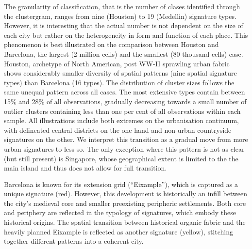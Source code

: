 The granularity of classification, that is the number of clases identified
through the clustergram, ranges from nine (Houston) to 19 (Medellin) signature
types. However, it is interesting that the actual number is not dependent on the size of each
city but rather on the heterogeneity in form and function of each place. This
phenomenon is best illustrated on the comparison
between Houston and Barcelona, the largest (2 million cells) and the smallest (80 thousand
cells) case. Houston, archetype of North American, post WW-II sprawling urban fabric shows
considerably smaller diversity of spatial patterns (nine spatial signature
types) than
Barcelona (16 types).
The distribution of cluster sizes follows the same unequal pattern across
all cases. The most extensive types contain between 15\% and 28\% of all
observations, gradually decreasing towards a small number of
outlier clusters containing less than one per cent of all observations within each sample.
All illustrations include both extremes on the urbanisation continuum, with delineated
central districts on the one hand and non-urban countryside signatures on the
other. We interpret this
transition as a gradual move from more urban signatures to less so. The only
exception where this pattern is not as clear (but
still present) is Singapore, whose geographical extent is limited to the
the main island and thus does not allow for full transition.

Barcelona is known for its extension grid (``Eixample''), which is captured as
a unique signature (red).
However, this development is historically an infill between the city's medieval core and
smaller preexisting peripheric settlements. Both core and periphery are
reflected in the typology of signatures, which embody these historical
origins. The spatial transition between historical organic fabric and the
heavily planned
Eixample is reflected as another signature (yellow), stitching together different patterns into a coherent city.

